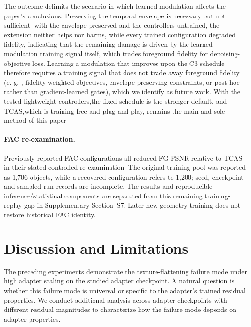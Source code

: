 \documentclass[times,twocolumn,final]{elsarticle}
\providecommand{\DIFadd}[1]{{\protect\color{blue} \sf #1}} %
\providecommand{\DIFdel}[1]{{\protect\color{red} \scriptsize #1}} %
\providecommand{\DIFaddbegin}{} %
\providecommand{\DIFaddend}{} %
\providecommand{\DIFdelbegin}{} %
\providecommand{\DIFdelend}{} %
\begin{document}
\DIFdelbegin \DIFdel{The outcome delimits the scenario in which learned modulation affects the paper's conclusions. Preserving the temporal envelope is necessary but not sufficient: with the envelope preserved and the controllers untrained, the extension neither helps nor harms, while every trained configuration degraded fidelity, indicating that the remaining damage is driven by the learned-modulation training signal itself, which trades foreground fidelity for denoising-objective loss. Learning a modulation that improves upon the C3 schedule therefore requires a training signal that does not trade away foreground fidelity (e.
g. , fidelity-weighted objectives, envelope-preserving constraints, or post-hoc rather than gradient-learned gates), which we identify as future work. With the tested lightweight controllers,the fixed schedule is the stronger default, and TCAS,which is training-free and plug-and-play, remains the main and sole method of this paper}\DIFdelend \DIFaddbegin \paragraph{FAC re-examination.}
\label{subsec:facreported}
\DIFadd{Previously reported FAC configurations all reduced FG-PSNR relative to TCAS in their stated controlled re-examination. The original training pool was reported as 1,706 objects, while a recovered configuration refers to 1,200; seed, checkpoint and sampled-run records are incomplete. The results and reproducible inference/statistical components are separated from this remaining training-replay gap in Supplementary Section~S7. Later new geometry training does not restore historical FAC identity}\DIFaddend .


\FloatBarrier
\DIFaddbegin \section{Discussion and Limitations}
\label{sec:limitations}
\DIFaddend 

\DIFdelbegin %

\DIFdel{The preceding experiments demonstrate the texture-flattening failure mode under high adapter scaling on the studied adapter checkpoint. A natural question is whether this failure mode is universal or specific to the adapter's trained residual properties. We conduct additional analysis across adapter checkpoints with different residual magnitudes to characterize how the failure mode depends on adapter properties. }%
\end{document}
